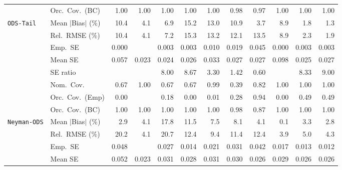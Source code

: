 \begin{landscape}
\begin{longtable}{llrrrrrrrrrr}
 & Orc.\ Cov.\ (BC) & \cellcolor{rankthree}1.00 & \cellcolor{rankthree}1.00 & \cellcolor{rankthree}1.00 & \cellcolor{rankthree}1.00 & \cellcolor{rankthree}1.00 & \cellcolor{ranktwo}0.98 & \cellcolor{rankone}0.97 & \cellcolor{rankthree}1.00 & \cellcolor{rankthree}1.00 & \cellcolor{rankthree}1.00 \\
\addlinespace[2pt]
\quad \texttt{ODS-Tail} & Mean $|$Bias$|$ (\%) & 10.4 & 4.1 & 6.9 & 15.2 & 13.0 & 10.9 & \cellcolor{rankthree}3.7 & 8.9 & \cellcolor{ranktwo}1.8 & \cellcolor{rankone}1.3 \\
 & Rel.\ RMSE (\%) & 10.4 & \cellcolor{rankthree}4.1 & 7.2 & 15.3 & 13.2 & 12.1 & 13.5 & 8.9 & \cellcolor{ranktwo}2.3 & \cellcolor{rankone}1.9 \\
 & Emp.\ SE & 0.000 &  & 0.003 & 0.003 & 0.010 & 0.019 & 0.045 & 0.000 & 0.003 & 0.003 \\
 & Mean SE & 0.057 & 0.023 & 0.024 & 0.026 & 0.033 & 0.027 & 0.027 & 0.098 & 0.025 & 0.027 \\
 & SE ratio &  &  & 8.00 & 8.67 & \cellcolor{rankthree}3.30 & \cellcolor{ranktwo}1.42 & \cellcolor{rankone}0.60 &  & 8.33 & 9.00 \\
 & Nom.\ Cov. & 0.67 & \cellcolor{ranktwo}1.00 & 0.67 & 0.67 & \cellcolor{rankone}0.99 & 0.39 & \cellcolor{rankthree}0.82 & \cellcolor{ranktwo}1.00 & \cellcolor{ranktwo}1.00 & \cellcolor{ranktwo}1.00 \\
 & Orc.\ Cov.\ (Emp) & 0.00 &  & 0.18 & 0.00 & 0.01 & \cellcolor{rankthree}0.28 & \cellcolor{rankone}0.94 & 0.00 & \cellcolor{ranktwo}0.49 & \cellcolor{ranktwo}0.49 \\
 & Orc.\ Cov.\ (BC) & \cellcolor{ranktwo}1.00 & \cellcolor{ranktwo}1.00 & \cellcolor{ranktwo}1.00 & \cellcolor{ranktwo}1.00 & \cellcolor{ranktwo}1.00 & \cellcolor{rankone}0.98 & \cellcolor{rankthree}0.87 & \cellcolor{ranktwo}1.00 & \cellcolor{ranktwo}1.00 & \cellcolor{ranktwo}1.00 \\
\addlinespace[2pt]
\quad \texttt{Neyman-ODS} & Mean $|$Bias$|$ (\%) & \cellcolor{rankthree}2.9 & 4.1 & 17.8 & 11.5 & 7.5 & 8.1 & 4.1 & \cellcolor{rankone}0.1 & 3.3 & \cellcolor{ranktwo}2.8 \\
 & Rel.\ RMSE (\%) & 20.2 & \cellcolor{ranktwo}4.1 & 20.7 & 12.4 & 9.4 & 11.4 & 12.4 & \cellcolor{rankone}3.9 & 5.0 & \cellcolor{rankthree}4.3 \\
 & Emp.\ SE & 0.048 &  & 0.027 & 0.014 & 0.021 & 0.031 & 0.042 & 0.017 & 0.013 & 0.012 \\
 & Mean SE & 0.052 & 0.023 & 0.031 & 0.028 & 0.031 & 0.030 & 0.026 & 0.029 & 0.026 & 0.026 \\

\end{longtable}
\end{landscape}
